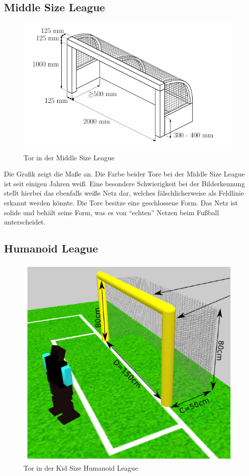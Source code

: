 \documentclass[a4paper,12pt]{article}
\begin{document}
\subsection{Middle Size League}

\begin{figure}[H]
    \includegraphics{middlesize-goal.png}
    \caption{Tor in der Middle Size League}
    \label{fig:goal-msl}
\end{figure}

Die Grafik zeigt die Maße an. Die Farbe beider Tore bei der Middle Size League ist seit einigen
Jahren weiß. Eine besondere Schwierigkeit bei der Bilderkennung stellt hierbei das ebenfalls
weiße Netz dar, welches
fälschlicherweise als Feldlinie erkannt werden könnte. Die Tore besitze eine geschlossene Form. Das
Netz ist solide und behält seine Form, was es von "`echten"' Netzen beim Fußball unterscheidet.


\subsection{Humanoid League}
\begin{figure}[H]
    \includegraphics{humanoid-kidsize-goal.png}
    \caption{Tor in der Kid Size Humanoid League}
    \label{fig:goal-human-kid}
\end{figure}
\end{document}
